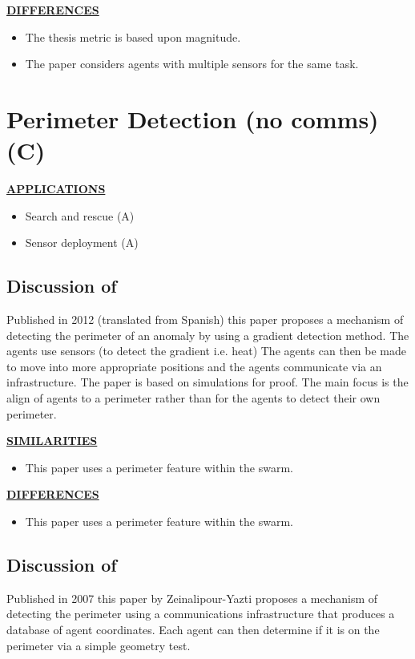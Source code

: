 \documentclass[a4paper,11pt,nocenter,bold,notitlepage,noheadline,noindent]{
thesis}
\begin{document}
\textbf{\underline{DIFFERENCES}}
\begin{itemize}
   \setlength\itemsep{0em}
	\item The thesis metric is based upon magnitude.
	\item The paper considers agents with multiple sensors for the same task.
\end{itemize} 

\section{Perimeter Detection (no comms) (C) \cite{SOM:12,ZAPS:07,ZFG:13,AKK:08,APZDAMC:09,AZDPS:11,JG:13,SALGVPJ:08,MD:09}}
\textbf{\underline{APPLICATIONS}}
\begin{itemize}
  \setlength\itemsep{0em}
	\item Search and rescue (A) \cite{SALGVPJ:08}
	\item Sensor deployment (A) \cite{SOM:12}
\end{itemize}

\subsection{Discussion of \cite{SOM:12}}
Published in 2012 (translated from Spanish) this paper proposes a mechanism of detecting the perimeter of an anomaly by using a gradient detection method. The agents use sensors (to detect the gradient i.e. heat) The agents can then be made to move into more appropriate positions and the agents communicate via an infrastructure. The paper is based on simulations for proof. The main focus is the align of agents to a perimeter rather than for the agents to detect their own perimeter.

\textbf{\underline{SIMILARITIES}}
\begin{itemize}
   \setlength\itemsep{0em}
	\item This paper uses a perimeter feature within the swarm.
\end{itemize} 

\textbf{\underline{DIFFERENCES}}
\begin{itemize}
   \setlength\itemsep{0em}
	\item This paper uses a perimeter feature within the swarm.
\end{itemize} 

\subsection{Discussion of \cite{ZAPS:07}}
Published in 2007 this paper by Zeinalipour-Yazti proposes a mechanism of detecting the perimeter using a communications infrastructure that produces a database of agent coordinates. Each agent can then determine if it is on the perimeter via a simple geometry test.
\end{document}
